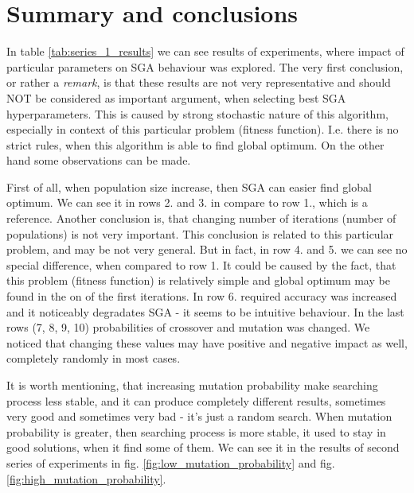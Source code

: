 \documentclass{classrep}
\begin{document}
    \section{Summary and conclusions} \label{summary} {
        In table \ref{tab:series_1_results} we can see results of experiments, where impact of
        particular parameters on SGA behaviour was explored. The very first conclusion, or rather a
        \emph{remark}, is that these results are not very representative and should NOT be
        considered as important argument, when selecting best SGA hyperparameters. This is caused by
        strong stochastic nature of this algorithm, especially in context of this particular problem
        (fitness function). I.e. there is no strict rules, when this algorithm is able to find
        global optimum. On the other hand some observations can be made.

        First of all, when population size increase, then SGA can easier find global optimum. We can
        see it in rows 2. and 3. in compare to row 1., which is a reference. Another conclusion is,
        that changing number of iterations (number of populations) is not very important. This
        conclusion is related to this particular problem, and may be not very general. But in fact,
        in row 4. and 5. we can see no special difference, when compared to row 1. It could be
        caused by the fact, that this problem (fitness function) is relatively simple and global
        optimum may be found in the on of the first iterations. In row 6. required accuracy was
        increased and it noticeably degradates SGA - it seems to be intuitive behaviour. In the last
        rows (7, 8, 9, 10) probabilities of crossover and mutation was changed. We noticed that
        changing these values may have positive and negative impact as well, completely
        randomly in most cases.

        It is worth mentioning, that increasing mutation probability make searching process less
        stable, and it can produce completely different results, sometimes very good and sometimes
        very bad - it's just a random search. When mutation probability is greater, then searching
        process is more stable, it used to stay in good solutions, when it find some of them. We can
        see it in the results of second series of experiments in fig.
        \ref{fig:low_mutation_probability} and fig. \ref{fig:high_mutation_probability}.
    } 

    \begin{thebibliography}{0}
    \end{thebibliography}
\end{document}
